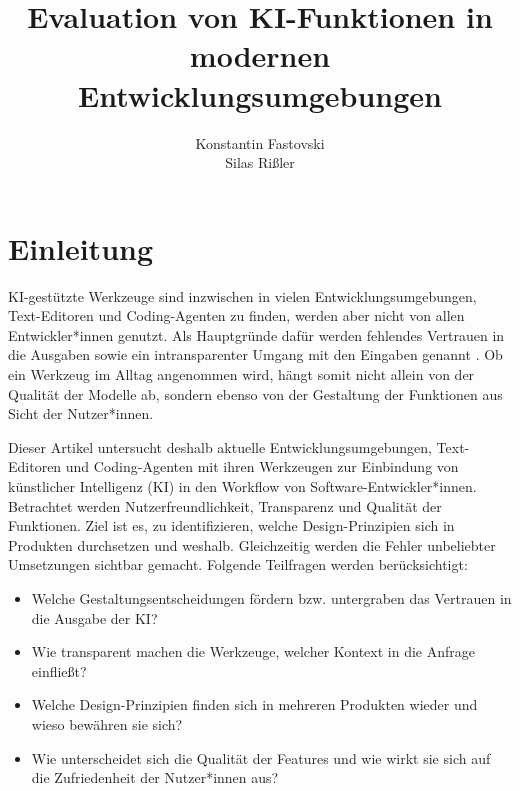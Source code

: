 \documentclass[ngerman]{seminarvorlage}
\begin{document}
\title{Evaluation von KI-Funktionen in modernen Entwicklungsumgebungen}
\author{
  \alignauthor Konstantin Fastovski \\
  \alignauthor Silas Rißler\\
  \email{}
}

\maketitle%
\newpage



\section{Einleitung}
KI-gestützte Werkzeuge sind inzwischen in vielen Entwicklungsumgebungen, Text-Editoren und Coding-Agenten zu finden, werden aber nicht von allen Entwickler*innen genutzt. Als Hauptgründe dafür werden fehlendes Vertrauen in die Ausgaben sowie ein intransparenter Umgang mit den Eingaben genannt \cite{Sergeyuk_2025}. Ob ein Werkzeug im Alltag angenommen wird, hängt somit nicht allein von der Qualität der Modelle ab, sondern ebenso von der Gestaltung der Funktionen aus Sicht der Nutzer*innen.

Dieser Artikel untersucht deshalb aktuelle Entwicklungsumgebungen, Text-Editoren und Coding-Agenten mit ihren Werkzeugen zur Einbindung von künstlicher Intelligenz (KI) in den Workflow von Software-Entwickler*innen. Betrachtet werden Nutzerfreundlichkeit, Transparenz und Qualität der Funktionen. Ziel ist es, zu identifizieren, welche Design-Prinzipien sich in Produkten durchsetzen und weshalb. Gleichzeitig werden die Fehler unbeliebter Umsetzungen sichtbar gemacht. Folgende Teilfragen werden berücksichtigt:
\begin{itemize}
  \item Welche Gestaltungsentscheidungen fördern bzw. untergraben das Vertrauen in die Ausgabe der KI?
  \item Wie transparent machen die Werkzeuge, welcher Kontext in die Anfrage einfließt?
  \item Welche Design-Prinzipien finden sich in mehreren Produkten wieder und wieso bewähren sie sich?
  \item Wie unterscheidet sich die Qualität der Features und wie wirkt sie sich auf die Zufriedenheit der Nutzer*innen aus?
\end{itemize}
\end{document}
